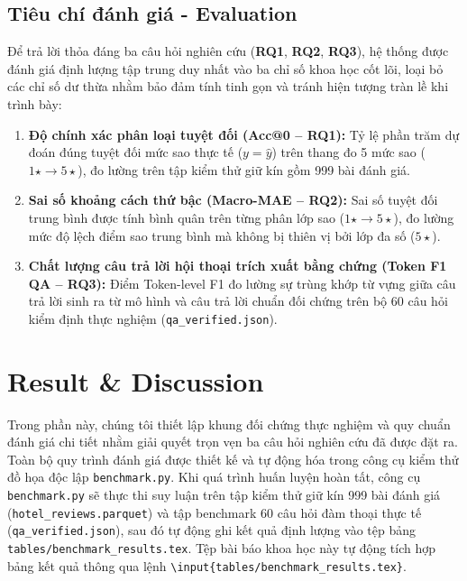 \documentclass[pdflatex,sn-mathphys-num]{sn-jnl}
\theoremstyle{thmstyleone}
\theoremstyle{thmstyletwo}
\theoremstyle{thmstylethree}
\begin{document}
\subsection{Tiêu chí đánh giá - Evaluation}
\label{subsec:evaluation}

Để trả lời thỏa đáng ba câu hỏi nghiên cứu (\textbf{RQ1}, \textbf{RQ2}, \textbf{RQ3}), hệ thống được đánh giá định lượng tập trung duy nhất vào ba chỉ số khoa học cốt lõi, loại bỏ các chỉ số dư thừa nhằm bảo đảm tính tinh gọn và tránh hiện tượng tràn lề khi trình bày:
\begin{enumerate}
    \item \textbf{Độ chính xác phân loại tuyệt đối (Acc@0 -- RQ1):} Tỷ lệ phần trăm dự đoán đúng tuyệt đối mức sao thực tế ($y = \hat{y}$) trên thang đo 5 mức sao ($1\star \to 5\star$), đo lường trên tập kiểm thử giữ kín gồm 999 bài đánh giá.
    \item \textbf{Sai số khoảng cách thứ bậc (Macro-MAE -- RQ2):} Sai số tuyệt đối trung bình được tính bình quân trên từng phân lớp sao ($1\star \to 5\star$), đo lường mức độ lệch điểm sao trung bình mà không bị thiên vị bởi lớp đa số ($5\star$).
    \item \textbf{Chất lượng câu trả lời hội thoại trích xuất bằng chứng (Token F1 QA -- RQ3):} Điểm Token-level F1 đo lường sự trùng khớp từ vựng giữa câu trả lời sinh ra từ mô hình và câu trả lời chuẩn đối chứng trên bộ 60 câu hỏi kiểm định thực nghiệm (\texttt{qa\_verified.json}).
\end{enumerate}


\section{Result \& Discussion}
\label{sec:resultanddiscussion}

Trong phần này, chúng tôi thiết lập khung đối chứng thực nghiệm và quy chuẩn đánh giá chi tiết nhằm giải quyết trọn vẹn ba câu hỏi nghiên cứu đã được đặt ra. Toàn bộ quy trình đánh giá được thiết kế và tự động hóa trong công cụ kiểm thử đồ họa độc lập \texttt{benchmark.py}. Khi quá trình huấn luyện hoàn tất, công cụ \texttt{benchmark.py} sẽ thực thi suy luận trên tập kiểm thử giữ kín 999 bài đánh giá (\texttt{hotel\_reviews.parquet}) và tập benchmark 60 câu hỏi đàm thoại thực tế (\texttt{qa\_verified.json}), sau đó tự động ghi kết quả định lượng vào tệp bảng \texttt{tables/benchmark\_results.tex}. Tệp bài báo khoa học này tự động tích hợp bảng kết quả thông qua lệnh \texttt{\textbackslash input\{tables/benchmark\_results.tex\}}.
\end{document}
